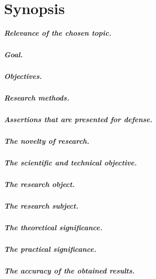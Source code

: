\chapter*{Synopsis}

\paragraph*{Relevance of the chosen topic.}
\paragraph*{Goal.}
\paragraph*{Objectives.}
\paragraph*{Research methods.}
\paragraph*{Assertions that are presented for defense.}
\paragraph*{The novelty of research.}
\paragraph*{The scientific and technical objective.}
\paragraph*{The research object.}
\paragraph*{The research subject.}
\paragraph*{The theoretical significance.}
\paragraph*{The practical significance.}
\paragraph*{The accuracy of the obtained results.}


